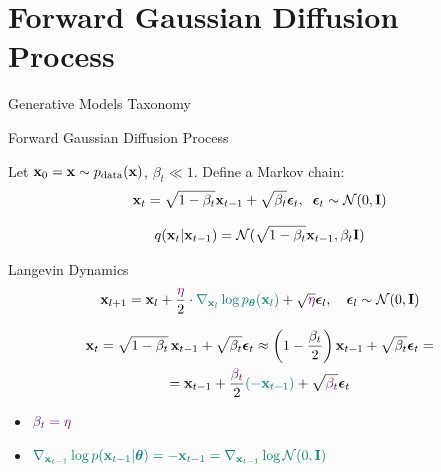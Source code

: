 \documentclass{beamer}
\renewcommand{\eqpause}{}
\begin{document}
\section{Forward Gaussian Diffusion Process}
\begin{frame}{Generative Models Taxonomy}
\end{frame}
\begin{frame}{Forward Gaussian Diffusion Process}

	Let $\mathbf{x}_0 = \mathbf{x} \sim p_{\text{data}}(\mathbf{x})$, $\beta_t \ll 1$. Define a Markov chain:
	\[
		\mathbf{x}_t = \sqrt{1 - \beta_t} \mathbf{x}_{t-1} + \sqrt{\beta_t} \boldsymbol{\epsilon}_t, \;\; \boldsymbol{\epsilon}_t \sim \mathcal{N}(0, \mathbf{I})
	\]
	\vspace{-0.5cm}
    \eqpause
	\[
		q(\mathbf{x}_t | \mathbf{x}_{t-1}) = \mathcal{N}(\sqrt{1 - \beta_t} \mathbf{x}_{t-1}, \beta_t \mathbf{I})
	\]
    \eqpause
	\vspace{-0.5cm}
	\begin{block}{Langevin Dynamics}
		\vspace{-0.3cm}
		\[
			\mathbf{x}_{l + 1} = \mathbf{x}_l + \frac{ \color{violet} \eta}{2} \cdot {\color{teal}\nabla_{\mathbf{x}_l} \log p_{\boldsymbol{\theta}}(\mathbf{x}_l)} + \sqrt{ \color{violet} \eta} \boldsymbol{\epsilon}_l, \quad \boldsymbol{\epsilon}_l \sim \mathcal{N}(0, \mathbf{I})
		\]
		\vspace{-0.5cm}
	\end{block}
    \eqpause
	\vspace{-0.7cm}
	\begin{multline*}
		\mathbf{x}_t = \sqrt{1 - \beta_t}\, \mathbf{x}_{t - 1} + \sqrt{\beta_t} \boldsymbol{\epsilon}_t \approx \left(1 - \frac{\beta_t}{2}\right)\mathbf{x}_{t-1} + \sqrt{\beta_t} \boldsymbol{\epsilon}_t = \\
		= \mathbf{x}_{t-1} + \frac{ \color{violet}  \beta_t}{2} {\color{teal} ( -\mathbf{x}_{t-1} )} + \sqrt{ \color{violet}  \beta_t} \boldsymbol{\epsilon}_t
	\end{multline*}
    \eqpause
	\vspace{-0.7cm}
	\begin{itemize}
		\item ${\color{violet} \beta_t = \eta }$
		\item ${\color{teal} \nabla_{\mathbf{x}_{t-1}}\log p(\mathbf{x}_{t-1} | \boldsymbol{\theta}) = - \mathbf{x}_{t-1} = \nabla_{\mathbf{x}_{t-1}} \log \mathcal{N}(0, \mathbf{I})}$
	\end{itemize}
 \end{frame}
\end{document}
